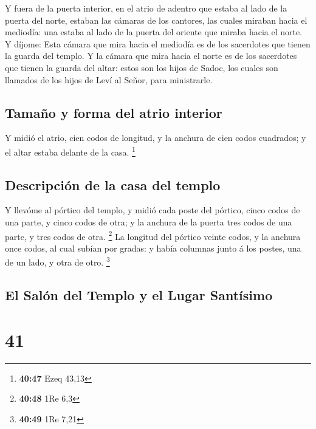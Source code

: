  Y fuera de la puerta interior, en el atrio de adentro
que estaba al lado de la puerta del norte, estaban las cámaras de los
cantores, las cuales miraban hacia el mediodía: una estaba al lado de la
puerta del oriente que miraba hacia el norte.  Y díjome:
Esta cámara que mira hacia el mediodía es de los sacerdotes que tienen
la guarda del templo.  Y la cámara que mira hacia el
norte es de los sacerdotes que tienen la guarda del altar: estos son los
hijos de Sadoc, los cuales son llamados de los hijos de Leví al Señor,
para ministrarle.

\hypertarget{tamauxf1o-y-forma-del-atrio-interior}{%
\subsection{Tamaño y forma del atrio
interior}\label{tamauxf1o-y-forma-del-atrio-interior}}

 Y midió el atrio, cien codos de longitud, y la anchura
de cien codos cuadrados; y el altar estaba delante de la casa.
\footnote{\textbf{40:47} Ezeq 43,13}

\hypertarget{descripciuxf3n-de-la-casa-del-templo}{%
\subsection{Descripción de la casa del
templo}\label{descripciuxf3n-de-la-casa-del-templo}}

 Y llevóme al pórtico del templo, y midió cada poste del
pórtico, cinco codos de una parte, y cinco codos de otra; y la anchura
de la puerta tres codos de una parte, y tres codos de otra. \footnote{\textbf{40:48}
  1Re 6,3}  La longitud del pórtico veinte codos, y la
anchura once codos, al cual subían por gradas: y había columnas junto á
los postes, una de un lado, y otra de otro. \footnote{\textbf{40:49} 1Re
  7,21}

\hypertarget{el-saluxf3n-del-templo-y-el-lugar-santuxedsimo}{%
\subsection{El Salón del Templo y el Lugar
Santísimo}\label{el-saluxf3n-del-templo-y-el-lugar-santuxedsimo}}

\hypertarget{section-40}{%
\section{41}\label{section-40}}

